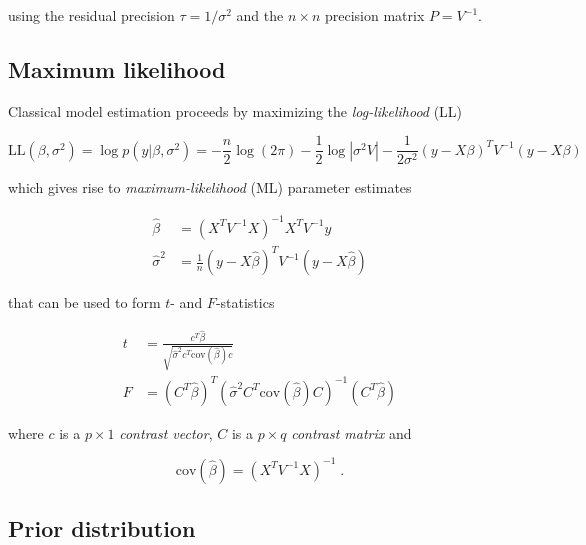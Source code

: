 using the residual precision $\tau = 1/\sigma^2$ and the $n \times n$ precision matrix $P = V^{-1}$.


\subsection{Maximum likelihood} \label{sec:GLM-MLE}

Classical model estimation proceeds by maximizing the \textit{log-likelihood} (LL)

\begin{equation} \label{eq:GLM-LL}
\mathrm{LL}(\beta,\sigma^2) = \log p(y|\beta,\sigma^2) = - \frac{n}{2} \log(2\pi) - \frac{1}{2} \log \left| \sigma^2 V \right| - \frac{1}{2 \sigma^2} (y - X\beta)^T V^{-1} (y - X\beta)
\end{equation}

which gives rise to \textit{maximum-likelihood} (ML) parameter estimates

\vspace{-0.5em}
\begin{equation} \label{eq:GLM-MLE}
\begin{split}
\hat{\beta} &= (X^T V^{-1} X)^{-1} X^T V^{-1} y \\
\hat{\sigma}^2 &= \frac{1}{n} (y - X\hat{\beta})^T V^{-1} (y - X\hat{\beta})
\end{split}
\end{equation}

that can be used to form $t$- and $F$-statistics

\vspace{-0.5em}
\begin{equation} \label{eq:GLM-tF}
\begin{split}
t &= \frac{c^T \hat{\beta}}{\sqrt{\hat{\sigma}^2 c^T \mathrm{cov}(\hat{\beta}) c}} \\
F &= (C^T \hat{\beta})^T (\hat{\sigma}^2 C^T \mathrm{cov}(\hat{\beta}) C)^{-1} (C^T \hat{\beta})
\end{split}
\end{equation}

where $c$ is a $p \times 1$ \textit{contrast vector}, $C$ is a $p \times q$ \textit{contrast matrix} and

\begin{equation} \label{eq:GLM-cov-beta-est}
\mathrm{cov}(\hat{\beta}) = (X^T V^{-1} X)^{-1} \; .
\end{equation}


\subsection{Prior distribution} \label{sec:GLM-NG-prior}

